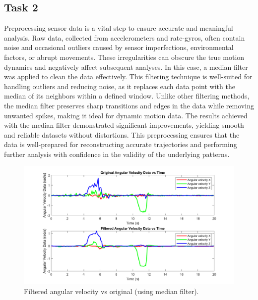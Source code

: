 \documentclass[12pt]{article}
\begin{document}
\subsection{Task 2}

Preprocessing sensor data is a vital step to ensure accurate and meaningful analysis. Raw data, collected from accelerometers and rate-gyros, often contain noise and occasional outliers caused by sensor imperfections, environmental factors, or abrupt movements. These irregularities can obscure the true motion dynamics and negatively affect subsequent analyses.
In this case, a median filter was applied to clean the data effectively. This filtering technique is well-suited for handling outliers and reducing noise, as it replaces each data point with the median of its neighbors within a defined window. Unlike other filtering methods, the median filter preserves sharp transitions and edges in the data while removing unwanted spikes, making it ideal for dynamic motion data.
The results achieved with the median filter demonstrated significant improvements, yielding smooth and reliable datasets without distortions. This preprocessing ensures that the data is well-prepared for reconstructing accurate trajectories and performing further analysis with confidence in the validity of the underlying patterns.

\begin{figure}[H]
    \centerline{\includegraphics[scale=0.8]{Imagens/originalangularvsfiltered.png}}
    \caption{Filtered angular velocity vs original (using median filter).}
    \label{fig}
\end{figure}
\end{document}
